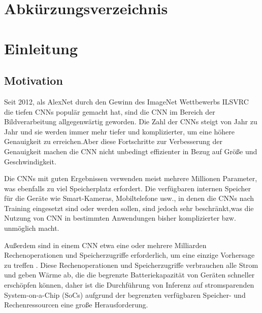 \documentclass[12pt,a4paper]{scrartcl}
\numberwithin{equation}{section}
\begin{document}
  \pagestyle{headings}
 \newpage
%
\section{Abkürzungsverzeichnis}
\begin{acronym}[THIBAUT]
\end{acronym}
\newpage
\section{Einleitung}
\subsection{Motivation}\label{motivation}
Seit 2012, als AlexNet \cite{AlexNet} durch den Gewinn des ImageNet Wettbewerbs \ac{ILSVRC} die tiefen \acsp{CNN} populär gemacht hat, sind die \acs{CNN} im Bereich der Bildverarbeitung allgegenwärtig geworden. Die Zahl der CNNs steigt von Jahr zu Jahr und sie werden immer mehr tiefer und komplizierter, um eine höhere Genauigkeit zu erreichen.Aber diese Fortschritte zur Verbesserung der Genauigkeit machen die CNN nicht unbedingt effizienter in Bezug auf Größe und Geschwindigkeit.

Die \acsp{CNN} mit guten Ergebnissen verwenden  meist mehrere Millionen Parameter, was ebenfalls zu viel Speicherplatz erfordert. Die verfügbaren internen Speicher für die Geräte wie Smart-Kameras, Mobiltelefone usw., in denen die CNNs nach Training eingesetzt sind oder werden sollen, sind jedoch sehr beschränkt,was die Nutzung von CNN in bestimmten Anwendungen bisher komplizierter bzw. unmöglich macht. 

Außerdem sind in einem CNN  etwa eine oder mehrere Milliarden Rechenoperationen und Speicherzugriffe erforderlich, um eine einzige Vorhersage zu treffen \cite{prunetoprune}. Diese Rechenoperationen und Speicherzugriffe verbrauchen alle Strom und geben Wärme ab, die die begrenzte Batteriekapazität von Geräten schneller erschöpfen können, daher ist die Durchführung von Inferenz auf stromsparenden System-on-a-Chip (SoCs) aufgrund der begrenzten verfügbaren Speicher- und Rechenressourcen eine große Herausforderung.
\end{document}
